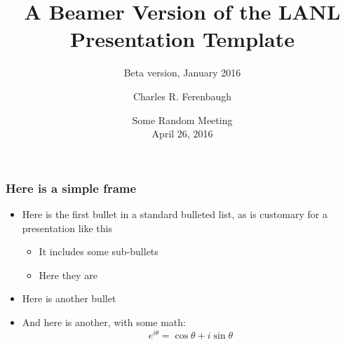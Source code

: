 \documentclass{beamer}
\title{A Beamer Version of the LANL Presentation Template}
\subtitle{Beta version, January 2016}
\author{Charles R. Ferenbaugh}
\date[4/26/2016]{Some Random Meeting \\ April 26, 2016}
\begin{document}
\begin{frame}
\maketitle
\end{frame}

\begin{frame}
\frametitle{Here is a simple frame}
    \begin{itemize}
        \item Here is the first bullet in a standard bulleted list,
            as is customary for a presentation like this
        \begin{itemize}
            \item It includes some sub-bullets
            \item Here they are
        \end{itemize}
        \item Here is another bullet
        \item And here is another, with some math:
            \[ e^{i\theta} = \cos \theta + i \sin \theta \]
    \end{itemize}
\end{frame}
\end{document}
